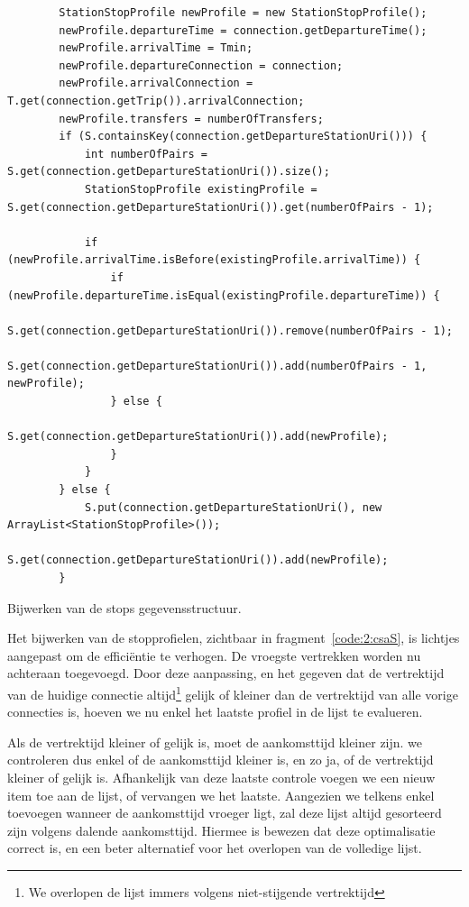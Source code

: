 \begin{listing}[h]
	\begin{verbatim}
		StationStopProfile newProfile = new StationStopProfile();
		newProfile.departureTime = connection.getDepartureTime();
		newProfile.arrivalTime = Tmin;
		newProfile.departureConnection = connection;
		newProfile.arrivalConnection = T.get(connection.getTrip()).arrivalConnection;
		newProfile.transfers = numberOfTransfers;
		if (S.containsKey(connection.getDepartureStationUri())) {
			int numberOfPairs = S.get(connection.getDepartureStationUri()).size();
			StationStopProfile existingProfile = S.get(connection.getDepartureStationUri()).get(numberOfPairs - 1);
		
			if (newProfile.arrivalTime.isBefore(existingProfile.arrivalTime)) {
				if (newProfile.departureTime.isEqual(existingProfile.departureTime)) {
					S.get(connection.getDepartureStationUri()).remove(numberOfPairs - 1);
					S.get(connection.getDepartureStationUri()).add(numberOfPairs - 1, newProfile);
				} else {
					S.get(connection.getDepartureStationUri()).add(newProfile);
				}
			}
		} else {
			S.put(connection.getDepartureStationUri(), new ArrayList<StationStopProfile>());
			S.get(connection.getDepartureStationUri()).add(newProfile);
		}
	\end{verbatim}
	\caption[CSA: Bijwerken S]{Bijwerken van de stops gegevensstructuur.}
	\label{code:2:csaS}
\end{listing}

Het bijwerken van de stopprofielen, zichtbaar in fragment~\ref{code:2:csaS}, is lichtjes aangepast om de efficiëntie te verhogen. De vroegste vertrekken worden nu achteraan toegevoegd. Door deze aanpassing, en het gegeven dat de vertrektijd van de huidige connectie altijd\footnote{We overlopen de lijst immers volgens niet-stijgende vertrektijd} gelijk of kleiner dan de vertrektijd van alle vorige connecties is, hoeven we nu enkel het laatste profiel in de lijst te evalueren.

Als de vertrektijd kleiner of gelijk is, moet de aankomsttijd kleiner zijn. we controleren dus enkel of de aankomsttijd kleiner is, en zo ja, of de vertrektijd kleiner of gelijk is. Afhankelijk van deze laatste controle voegen we een nieuw item toe aan de lijst, of vervangen we het laatste. Aangezien we telkens enkel toevoegen wanneer de aankomsttijd vroeger ligt, zal deze lijst altijd gesorteerd zijn volgens dalende aankomsttijd. Hiermee is bewezen dat deze optimalisatie correct is, en een beter alternatief voor het overlopen van de volledige lijst.

